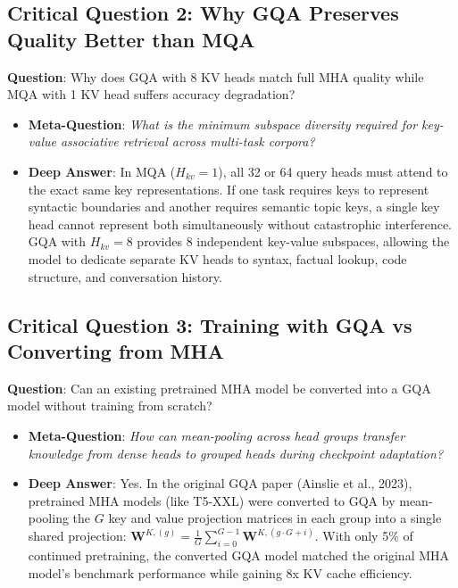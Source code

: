 \documentclass[11pt,a4paper]{article}
\theoremstyle{definition}
\begin{document}
\subsection{\textbf{Critical Question 2: Why GQA Preserves Quality Better than MQA}}
\textbf{Question}: Why does GQA with 8 KV heads match full MHA quality while MQA with 1 KV head suffers accuracy degradation?
\begin{itemize}
    \item \textbf{Meta-Question}: \emph{What is the minimum subspace diversity required for key-value associative retrieval across multi-task corpora?}
    \item \textbf{Deep Answer}: In MQA ($H_{kv} = 1$), all 32 or 64 query heads must attend to the exact same key representations. If one task requires keys to represent syntactic boundaries and another requires semantic topic keys, a single key head cannot represent both simultaneously without catastrophic interference. GQA with $H_{kv} = 8$ provides 8 independent key-value subspaces, allowing the model to dedicate separate KV heads to syntax, factual lookup, code structure, and conversation history.
\end{itemize}

\subsection{\textbf{Critical Question 3: Training with GQA vs Converting from MHA}}
\textbf{Question}: Can an existing pretrained MHA model be converted into a GQA model without training from scratch?
\begin{itemize}
    \item \textbf{Meta-Question}: \emph{How can mean-pooling across head groups transfer knowledge from dense heads to grouped heads during checkpoint adaptation?}
    \item \textbf{Deep Answer}: Yes. In the original GQA paper (Ainslie et al., 2023), pretrained MHA models (like T5-XXL) were converted to GQA by mean-pooling the $G$ key and value projection matrices in each group into a single shared projection: $\mathbf{W}^{K, (g)} = \frac{1}{G}\sum_{i=0}^{G-1} \mathbf{W}^{K, (g \cdot G + i)}$. With only 5\% of continued pretraining, the converted GQA model matched the original MHA model's benchmark performance while gaining 8x KV cache efficiency.
\end{itemize}
\end{document}
